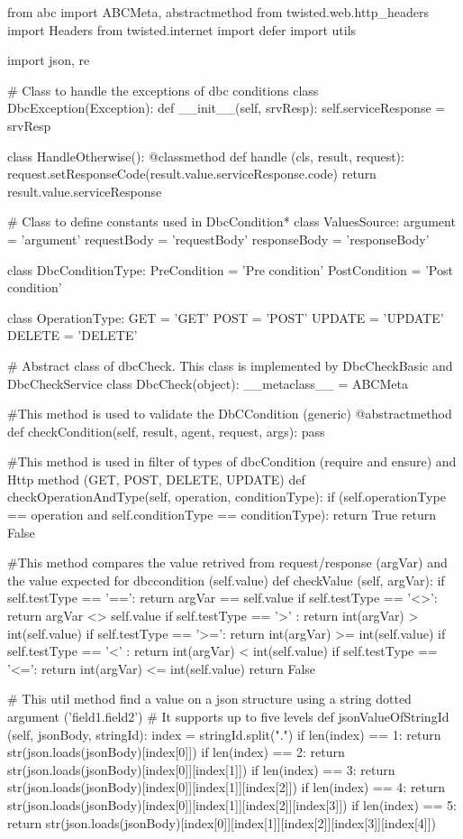 from abc import ABCMeta, abstractmethod
from twisted.web.http_headers import Headers
from twisted.internet import defer
import utils

import json, re

# Class to handle the exceptions of dbc conditions
class DbcException(Exception):
    def __init__(self, srvResp):
        self.serviceResponse = srvResp

class HandleOtherwise():
    @classmethod
    def handle (cls, result, request):
        request.setResponseCode(result.value.serviceResponse.code)
        return result.value.serviceResponse

# Class to define constants used in DbcCondition*
class ValuesSource:
    argument = 'argument'
    requestBody = 'requestBody'
    responseBody = 'responseBody'

class DbcConditionType:
    PreCondition = 'Pre condition'
    PostCondition = 'Post condition'

class OperationType:
    GET = 'GET'
    POST = 'POST'
    UPDATE = 'UPDATE'
    DELETE = 'DELETE'

# Abstract class of dbcCheck. This class is implemented by DbcCheckBasic and DbcCheckService
class DbcCheck(object):
    __metaclass__ = ABCMeta
    
    #This method is used to validate the DbCCondition (generic)
    @abstractmethod
    def checkCondition(self, result, agent, request, args): pass

    #This method is used in filter of types of dbcCondition (require and ensure) and Http method (GET, POST, DELETE, UPDATE)
    def checkOperationAndType(self, operation, conditionType):
        if (self.operationType == operation and self.conditionType == conditionType):
            return True
        return False

    #This method compares the value retrived from request/response (argVar) and the value expected for dbccondition (self.value)
    def checkValue (self, argVar):
        if self.testType == '==': return     argVar  == self.value
        if self.testType == '<>': return     argVar  <> self.value
        if self.testType == '>' : return int(argVar) >  int(self.value)
        if self.testType == '>=': return int(argVar) >= int(self.value)
        if self.testType == '<' : return int(argVar) <  int(self.value)
        if self.testType == '<=': return int(argVar) <= int(self.value)
        return False
    
    # This util method find a value on a json structure using a string dotted argument ('field1.field2')
    # It supports up to five levels
    def jsonValueOfStringId (self, jsonBody, stringId):
        index = stringId.split(".")
        if len(index) == 1: return str(json.loads(jsonBody)[index[0]])
        if len(index) == 2: return str(json.loads(jsonBody)[index[0]][index[1]])
        if len(index) == 3: return str(json.loads(jsonBody)[index[0]][index[1]][index[2]])
        if len(index) == 4: return str(json.loads(jsonBody)[index[0]][index[1]][index[2]][index[3]])
        if len(index) == 5: return str(json.loads(jsonBody)[index[0]][index[1]][index[2]][index[3]][index[4]])
 
